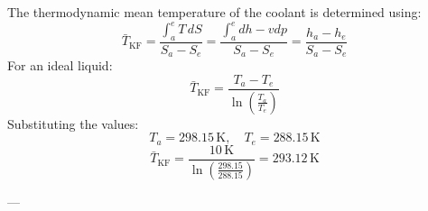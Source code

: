 The thermodynamic mean temperature of the coolant is determined using:  
\[
\bar{T}_{\text{KF}} = \frac{\int_a^e T \, dS}{S_a - S_e} = \frac{\int_a^e dh - v dp}{S_a - S_e} = \frac{h_a - h_e}{S_a - S_e}
\]  
For an ideal liquid:  
\[
\bar{T}_{\text{KF}} = \frac{T_a - T_e}{\ln \left( \frac{T_a}{T_e} \right)}
\]  
Substituting the values:  
\[
T_a = 298.15 \, \text{K}, \quad T_e = 288.15 \, \text{K}
\]  
\[
\bar{T}_{\text{KF}} = \frac{10 \, \text{K}}{\ln \left( \frac{298.15}{288.15} \right)} = 293.12 \, \text{K}
\]  

---